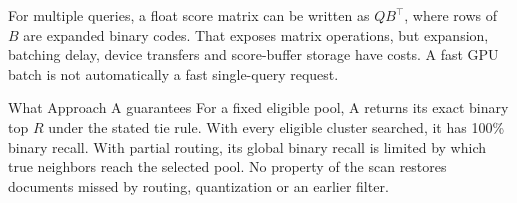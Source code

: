 For multiple queries, a float score matrix can be written as $QB^\top$, where rows of $B$ are
expanded binary codes. That exposes matrix operations, but expansion, batching delay, device
transfers and score-buffer storage have costs. A fast GPU batch is not automatically a fast
single-query request.

\begin{resultbox}{What Approach A guarantees}
For a fixed eligible pool, A returns its exact binary top $R$ under the stated tie rule.
With every eligible cluster searched, it has 100\% binary recall. With partial routing,
its global binary recall is limited by which true neighbors reach the selected pool.
No property of the scan restores documents missed by routing, quantization or an earlier filter.
\end{resultbox}
